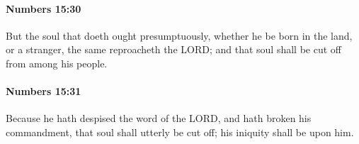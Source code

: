 		\paragraph{Numbers 15:30} %
			\label{NUMBERS-15-30}

			But the soul that doeth ought presumptuously, whether he be born in the land, or a stranger, the same reproacheth the LORD; and that soul shall be cut off from among his people.


		\paragraph{Numbers 15:31} %
			\label{NUMBERS-15-31}

			Because he hath despised the word of the LORD, and hath broken his commandment, that soul shall utterly be cut off; his iniquity shall be upon him.


